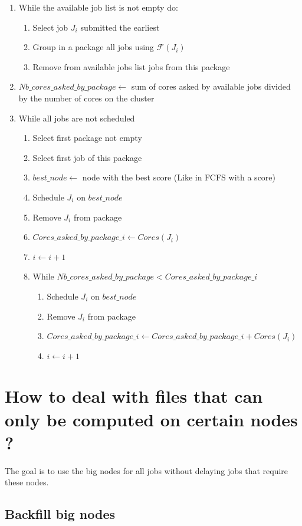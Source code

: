 \documentclass[a4paper]{article}
\newcommand{\inputs}{\ensuremath{\mathcal{F}}\xspace}
\begin{document}
\begin{enumerate}
	\item While the available job list is not empty do:
	\begin{enumerate}
		\item Select job $J_i$ submitted the earliest
		\item Group in a package all jobs using $\inputs(J_i)$
		\item Remove from available jobs list jobs from this package
	\end{enumerate}
	\item $Nb\_cores\_asked\_by\_package \gets $ sum of cores asked by available jobs divided by the number of cores on the cluster
	\item While all jobs are not scheduled
	\begin{enumerate}
		\item Select first package not empty
		\item Select first job of this package
		\item $best\_node \gets$ node with the best score (Like in FCFS with a score)
		\item Schedule $J_i$ on $best\_node$
		\item Remove $J_i$ from package
		\item $Cores\_asked\_by\_package\_i \gets Cores(J_i)$
		\item $i \gets i + 1$
		\item While $Nb\_cores\_asked\_by\_package < Cores\_asked\_by\_package\_i$
		\begin{enumerate}
			\item Schedule $J_{i}$ on $best\_node$
			\item Remove $J_{i}$ from package
			\item $Cores\_asked\_by\_package\_i \gets Cores\_asked\_by\_package\_i + Cores(J_{i})$
			\item $i \gets i + 1$
		\end{enumerate}
	\end{enumerate}
\end{enumerate}

\section{How to deal with files that can only be computed on certain nodes ?}
The goal is to use the big nodes for all jobs without delaying jobs that require these nodes.

\subsection{Backfill big nodes}
\end{document}
